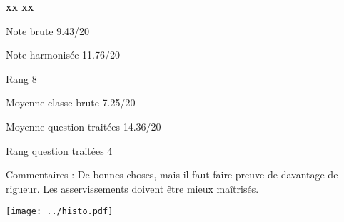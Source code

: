 \begin{minipage}[c]{.45\linewidth} 
\Large \textbf{\textsf{xx xx}} 
 
 \normalsize Note brute 9.43/20 
 
 \normalsize Note harmonisée 11.76/20 
 
Rang 8
 
Moyenne classe brute 7.25/20 
 
Moyenne question traitées 14.36/20 
 
Rang question traitées 4 
 
Commentaires : 
De bonnes choses, mais il faut faire preuve de davantage de rigueur. Les asservissements doivent être mieux maîtrisés.  
\end{minipage}\hfill 
\begin{minipage}[c]{.45\linewidth}  
\begin{center}
\texttt{[image: ../histo.pdf]} 
\end{center}
\end{minipage}
\footnotesize 
